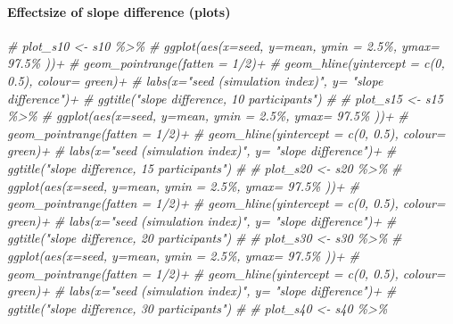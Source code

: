 \documentclass[
]{article}
\newenvironment{Shaded}{\begin{snugshade}}{\end{snugshade}}
\newcommand{\CommentTok}[1]{\textcolor[rgb]{0.56,0.35,0.01}{\textit{#1}}}
\begin{document}
\hypertarget{effectsize-of-slope-difference-plots}{%
\paragraph{Effectsize of slope difference
(plots)}\label{effectsize-of-slope-difference-plots}}

\begin{Shaded}
\begin{Highlighting}[]
\CommentTok{\# plot\_s10 \textless{}{-} s10 \%\textgreater{}\% }
\CommentTok{\#   ggplot(aes(x=seed, y=mean, ymin = \textasciigrave{}2.5\%\textasciigrave{}, ymax= \textasciigrave{}97.5\%\textasciigrave{} ))+}
\CommentTok{\#   geom\_pointrange(fatten = 1/2)+}
\CommentTok{\#   geom\_hline(yintercept = c(0, 0.5), colour= \textquotesingle{}green\textquotesingle{})+}
\CommentTok{\#   labs(x="seed (simulation index)", y= "slope difference")+}
\CommentTok{\#   ggtitle("slope difference, 10 participants")}
\CommentTok{\# }
\CommentTok{\# plot\_s15 \textless{}{-} s15 \%\textgreater{}\% }
\CommentTok{\#   ggplot(aes(x=seed, y=mean, ymin = \textasciigrave{}2.5\%\textasciigrave{}, ymax= \textasciigrave{}97.5\%\textasciigrave{} ))+}
\CommentTok{\#   geom\_pointrange(fatten = 1/2)+}
\CommentTok{\#   geom\_hline(yintercept = c(0, 0.5), colour= \textquotesingle{}green\textquotesingle{})+}
\CommentTok{\#   labs(x="seed (simulation index)", y= "slope difference")+}
\CommentTok{\#   ggtitle("slope difference, 15 participants")}
\CommentTok{\# }
\CommentTok{\# plot\_s20 \textless{}{-} s20 \%\textgreater{}\% }
\CommentTok{\#   ggplot(aes(x=seed, y=mean, ymin = \textasciigrave{}2.5\%\textasciigrave{}, ymax= \textasciigrave{}97.5\%\textasciigrave{} ))+}
\CommentTok{\#   geom\_pointrange(fatten = 1/2)+}
\CommentTok{\#   geom\_hline(yintercept = c(0, 0.5), colour= \textquotesingle{}green\textquotesingle{})+}
\CommentTok{\#   labs(x="seed (simulation index)", y= "slope difference")+}
\CommentTok{\#   ggtitle("slope difference, 20 participants")}
\CommentTok{\# }
\CommentTok{\# plot\_s30 \textless{}{-} s30 \%\textgreater{}\% }
\CommentTok{\#   ggplot(aes(x=seed, y=mean, ymin = \textasciigrave{}2.5\%\textasciigrave{}, ymax= \textasciigrave{}97.5\%\textasciigrave{} ))+}
\CommentTok{\#   geom\_pointrange(fatten = 1/2)+}
\CommentTok{\#   geom\_hline(yintercept = c(0, 0.5), colour= \textquotesingle{}green\textquotesingle{})+}
\CommentTok{\#   labs(x="seed (simulation index)", y= "slope difference")+}
\CommentTok{\#   ggtitle("slope difference, 30 participants")}
\CommentTok{\# }
\CommentTok{\# plot\_s40 \textless{}{-} s40 \%\textgreater{}\% }

\end{Highlighting}
\end{Shaded}
\end{document}
